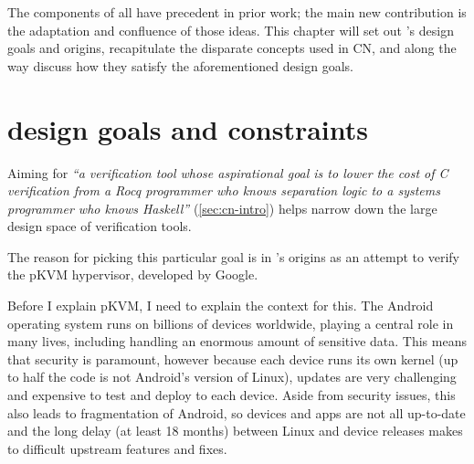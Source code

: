 \margintoc{}

The components of  all have precedent in prior work; the main
new contribution is the adaptation and confluence of those ideas. This chapter
will set out 's design goals and origins, recapitulate the disparate
concepts used in CN, and along the way discuss how they satisfy the
aforementioned design goals.

\section{ design goals and constraints}%
\label{sec:cn-goals}

Aiming for \emph{``a verification tool whose aspirational goal is to lower the
cost of C verification from a Rocq programmer who knows separation logic to a
systems programmer who knows Haskell''} (\cref{sec:cn-intro}) helps narrow
down the large design space of verification tools.

The reason for picking this particular goal is in 's origins as
an attempt to verify the pKVM hypervisor, developed by Google.

Before I explain pKVM, I need to explain the context for this. The Android
operating system runs on billions of devices worldwide, playing a central role
in many lives, including handling an enormous amount of sensitive data. This
means that security is paramount, however because each device runs its own
kernel (up to half the code is not Android's version of Linux), updates are
very challenging and expensive to test and deploy to each device. Aside from
security issues, this also leads to fragmentation of Android, so devices and
apps are not all up-to-date and the long delay (at least 18 months) between
Linux and device releases makes to difficult upstream features and fixes.%

